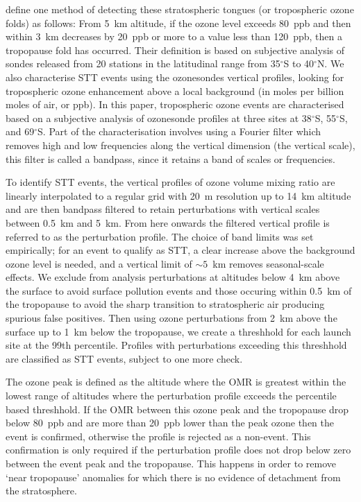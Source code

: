 \documentclass{article}
\begin{document}
    \citet{Tang2010} define one method of detecting these stratospheric tongues (or tropospheric ozone folds)  as follows: From 5~km altitude, if the ozone level exceeds 80~ppb and then within 3~km decreases by 20~ppb or more to a value less than 120~ppb, then a tropopause fold has occurred.
    Their definition is based on subjective analysis of sondes released from 20 stations in the latitudinal range from 35$^\circ$S to 40$^\circ$N.
    We also characterise STT events using the ozonesondes vertical profiles, looking for tropospheric ozone enhancement above a local background (in moles per billion moles of air, or ppb).
    In this paper, tropospheric ozone events are characterised based on a subjective analysis of ozonesonde profiles at three sites at 38$^\circ$S, 55$^\circ$S, and 69$^\circ$S.
    Part of the characterisation involves using a Fourier filter which removes high and low frequencies along the vertical dimension (the vertical scale), this filter is called a bandpass, since it retains a band of scales or frequencies.
    
    To identify STT events, the vertical profiles of ozone volume mixing ratio are linearly interpolated to a regular grid with 20~m resolution up to 14~km altitude and are then bandpass filtered to retain perturbations with vertical scales between 0.5~km and 5~km.
    From here onwards the filtered vertical profile is referred to as the perturbation profile.
    The choice of band limits was set empirically; for an event to qualify as STT, a clear increase above the background ozone level is needed, and a vertical limit of $\sim 5$~km removes seasonal-scale effects.
    We exclude from analysis perturbations at altitudes below 4~km above the surface to avoid surface pollution events and those occuring within 0.5~km of the tropopause to avoid the sharp transition to stratospheric air producing spurious false positives.
    Then using ozone perturbations from 2~km above the surface up to 1~km below the tropopause, we create a threshhold for each launch site at the 99th percentile.
    Profiles with perturbations exceeding this threshhold are classified as STT events, subject to one more check.
    
    The ozone peak is defined as the altitude where the OMR is greatest within the lowest range of altitudes where the perturbation profile exceeds the percentile based threshhold.
    If the OMR between this ozone peak and the tropopause drop below 80~ppb and are more than 20~ppb lower than the peak ozone then the event is confirmed, otherwise the profile is rejected as a non-event.
    This confirmation is only required if the perturbation profile does not drop below zero between the event peak and the tropopause.
    This happens in order to remove `near tropopause' anomalies for which there is no evidence of detachment from the stratosphere.
\end{document}
